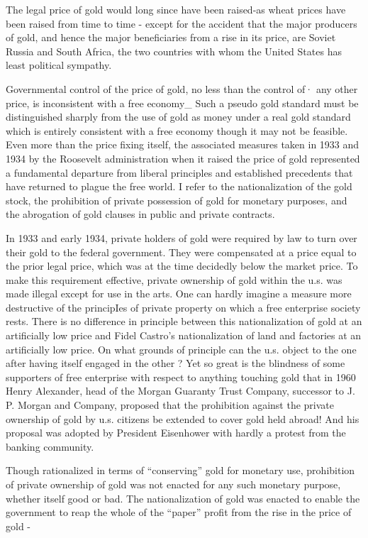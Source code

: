 \documentclass[11pt,openany]{book}
\begin{document}
The legal price of gold would long since have been raised-as wheat prices have been raised from time to time - except for the accident that the major producers of gold, and hence the major beneficiaries from a rise in its price, are Soviet Russia and South Africa, the two countries with whom the United States has least political sympathy.

Governmental control of the price of gold, no less than the control of· any other price, is inconsistent with a free economy\_ Such a pseudo gold standard must be distinguished sharply from the use of gold as money under a real gold standard which is entirely consistent with a free economy though it may not be feasible. Even more than the price fixing itself, the associated measures taken in 1933 and 1934 by the Roosevelt administration when it raised the price of gold represented a fundamental departure from liberal principles and established precedents that have returned to plague the free world. I refer to the nationalization of the gold stock, the prohibition of private possession of gold for monetary purposes, and the abrogation of gold clauses in public and private contracts.

In 1933 and early 1934, private holders of gold were required by law to turn over their gold to the federal government. They were compensated at a price equal to the prior legal price, which was at the time decidedly below the market price. To make this requirement effective, private ownership of gold within the u.s. was made illegal except for use in the arts. One can hardly imagine a measure more destructive of the principIes of private property on which a free enterprise society rests. There is no difference in principle between this nationalization of gold at an artificially low price and Fidel Castro's nationalization of land and factories at an artificially low price. On what grounds of principle can the u.s. object to the one after having itself engaged in the other ? Yet so great is the blindness of some supporters of free enterprise with respect to anything touching gold that in 1960 Henry Alexander, head of the Morgan Guaranty Trust Company, successor to J. P. Morgan and Company, proposed that the prohibition against the private ownership of gold by u.s. citizens be extended to cover gold held abroad! And his proposal was adopted by President Eisenhower with hardly a protest from the banking community.

Though rationalized in terms of ``conserving'' gold for monetary use, prohibition of private ownership of gold was not enacted for any such monetary purpose, whether itself good or bad. The nationalization of gold was enacted to enable the government to reap the whole of the ``paper'' profit from the rise in the price of gold -
\end{document}
